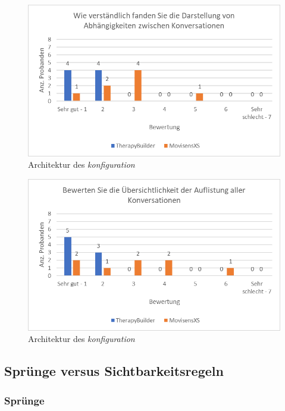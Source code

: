 \begin{figure}[h]
\centering
\includegraphics[width=1\textwidth]{pictures/diagramme/konversationenabhaeng}
\caption{Architektur des \emph{konfiguration}}
\label{konversationenabhaeng}
\end{figure}

\begin{figure}[h]
\centering
\includegraphics[width=1\textwidth]{pictures/diagramme/konversationenuebersicht}
\caption{Architektur des \emph{konfiguration}}
\label{konversationenuebersicht}
\end{figure}




\subsection{Sprünge versus Sichtbarkeitsregeln}

\subsubsection{Sprünge}

